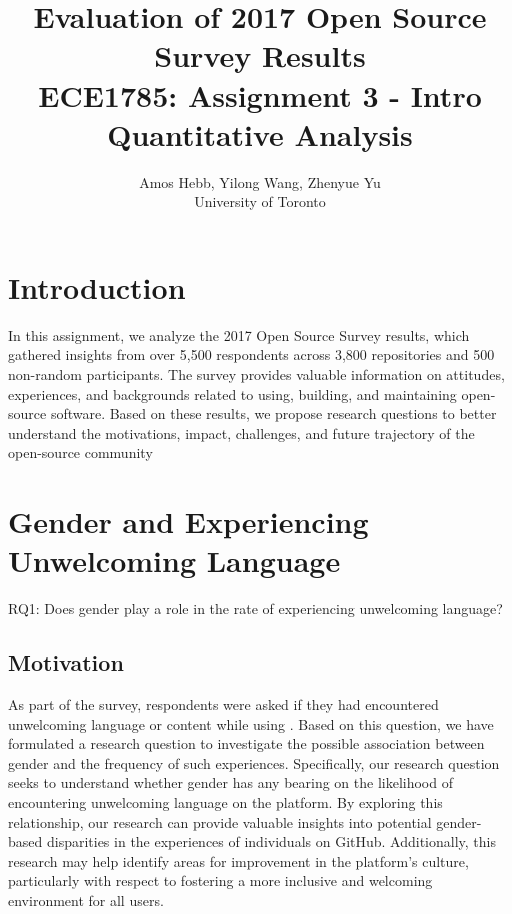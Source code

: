 \documentclass[journal,12pt,onecolumn,]{IEEEtran}
\begin{document}
\title{Evaluation of 2017 Open Source Survey Results \\
{\normalsize ECE1785: Assignment 3 - Intro Quantitative Analysis}}

\author{Amos Hebb, Yilong Wang, Zhenyue Yu\\ \small University of Toronto}

\maketitle

\section{Introduction}

In this assignment, we analyze the  2017 Open Source Survey results, 
which gathered insights from over 5,500 respondents across 3,800 repositories and 500 non-random participants. 
The survey provides valuable information on attitudes, experiences, and backgrounds related to using, building, 
and maintaining open-source software. Based on these results, 
we propose research questions to better understand the motivations, impact, challenges, and future trajectory of the open-source community

\section{Gender and Experiencing Unwelcoming Language}

 RQ1: Does gender play a role in the rate of experiencing unwelcoming language?

\subsection{Motivation}

As part of the survey, respondents were asked if they had encountered unwelcoming language or content while using . 
Based on this question, we have formulated a research question to investigate the possible association between gender and the frequency of such experiences. 
Specifically, our research question seeks to understand whether gender has any bearing on the likelihood of encountering unwelcoming language on the platform. 
By exploring this relationship, our research can provide valuable insights into potential gender-based disparities in the experiences of individuals on GitHub. 
Additionally, this research may help identify areas for improvement in the platform's culture, particularly with respect to fostering a more inclusive and welcoming environment for all users.
\end{document}

